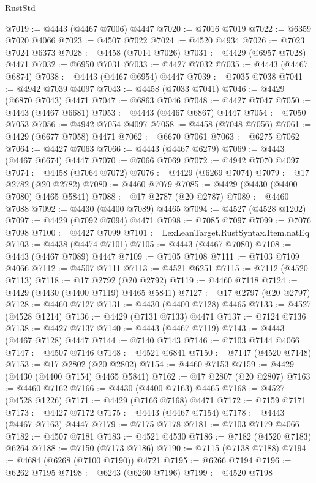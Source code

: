 \begin{lexlean}{RustStd}
\begin{coremodule}
{\begin{coremodule}
{{{{{{{{{{{{{{{{{{{{{{{{{{{{{{{{{{{{{{{{{{{{{{{{{{{{{{{{{{{{{{{{{{{{@7019 := @4443 (@4467 @7006) @4447
@7020 := @7016 @7019
@7022 := @6359 @7020 @4066
@7023 := @4507 @7022
@7024 := @4520 @4934
@7026 := @7023 @7024 @6373
@7028 := @4458 (@7014 @7026)
@7031 := @4429 (@6957 @7028) @4471
@7032 := @6950 @7031
@7033 := @4427 @7032
@7035 := @4443 (@4467 @6874)
@7038 := @4443 (@4467 @6954) @4447
@7039 := @7035 @7038
@7041 := @4942 @7039 @4097
@7043 := @4458 (@7033 @7041)
@7046 := @4429 (@6870 @7043) @4471
@7047 := @6863 @7046
@7048 := @4427 @7047
@7050 := @4443 (@4467 @6681)
@7053 := @4443 (@4467 @6867) @4447
@7054 := @7050 @7053
@7056 := @4942 @7054 @4097
@7058 := @4458 (@7048 @7056)
@7061 := @4429 (@6677 @7058) @4471
@7062 := @6670 @7061
@7063 := @6275 @7062
@7064 := @4427 @7063
@7066 := @4443 (@4467 @6279)
@7069 := @4443 (@4467 @6674) @4447
@7070 := @7066 @7069
@7072 := @4942 @7070 @4097
@7074 := @4458 (@7064 @7072)
@7076 := @4429 (@6269 @7074)
@7079 := @17 @2782 (@20 @2782)
@7080 := @4460 @7079
@7085 := @4429 (@4430 (@4400 @7080) @4465 @5841)
@7088 := @17 @2787 (@20 @2787)
@7089 := @4460 @7088
@7092 := @4430 (@4400 @7089) @4465
@7094 := @4527 (@4528 @1202)
@7097 := @4429 (@7092 @7094) @4471
@7098 := @7085 @7097
@7099 := @7076 @7098
@7100 := @4427 @7099
@7101 := LexLeanTarget.RustSyntax.Item.natEq
@7103 := @4438 (@4474 @7101)
@7105 := @4443 (@4467 @7080)
@7108 := @4443 (@4467 @7089) @4447
@7109 := @7105 @7108
@7111 := @7103 @7109 @4066
@7112 := @4507 @7111
@7113 := @4521 @6251
@7115 := @7112 (@4520 @7113)
@7118 := @17 @2792 (@20 @2792)
@7119 := @4460 @7118
@7124 := @4429 (@4430 (@4400 @7119) @4465 @5841)
@7127 := @17 @2797 (@20 @2797)
@7128 := @4460 @7127
@7131 := @4430 (@4400 @7128) @4465
@7133 := @4527 (@4528 @1214)
@7136 := @4429 (@7131 @7133) @4471
@7137 := @7124 @7136
@7138 := @4427 @7137
@7140 := @4443 (@4467 @7119)
@7143 := @4443 (@4467 @7128) @4447
@7144 := @7140 @7143
@7146 := @7103 @7144 @4066
@7147 := @4507 @7146
@7148 := @4521 @6841
@7150 := @7147 (@4520 @7148)
@7153 := @17 @2802 (@20 @2802)
@7154 := @4460 @7153
@7159 := @4429 (@4430 (@4400 @7154) @4465 @5841)
@7162 := @17 @2807 (@20 @2807)
@7163 := @4460 @7162
@7166 := @4430 (@4400 @7163) @4465
@7168 := @4527 (@4528 @1226)
@7171 := @4429 (@7166 @7168) @4471
@7172 := @7159 @7171
@7173 := @4427 @7172
@7175 := @4443 (@4467 @7154)
@7178 := @4443 (@4467 @7163) @4447
@7179 := @7175 @7178
@7181 := @7103 @7179 @4066
@7182 := @4507 @7181
@7183 := @4521 @4530
@7186 := @7182 (@4520 @7183) @6264
@7188 := @7150 (@7173 @7186)
@7190 := @7115 (@7138 @7188)
@7194 := @4684 (@6268 (@7100 @7190)) @4721
@7195 := @6266 @7194
@7196 := @6262 @7195
@7198 := @6243 (@6260 @7196)
@7199 := @4520 @7198
}}}}}}}}}}}}}}}}}}}}}}}}}}}}}}}}}}}}}}}}}}}}}}}}}}}}}}}}}}}}}}}}}}}}
\end{coremodule}}
\end{coremodule}
\end{lexlean}

